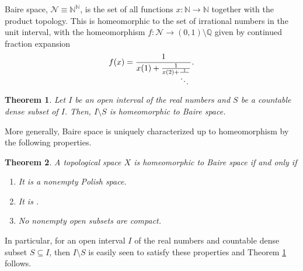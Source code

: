 \documentclass[12pt]{article}
\newtheorem{theorem}{Theorem}
\begin{document}

Baire space, $\mathcal{N}\equiv\mathbb{N}^\mathbb{N}$, is the set of all functions $x\colon\mathbb{N}\rightarrow\mathbb{N}$ together with the product topology. This is homeomorphic to the set of irrational numbers in the unit interval, with the homeomorphism $f\colon\mathcal{N}\rightarrow(0,1)\setminus\mathbb{Q}$ given by continued fraction expansion
\begin{equation*}
f(x)=\frac{1}{x(1)+\frac{1}{x(2)+\frac{1}{\ddots}}}.
\end{equation*}

\begin{theorem}\label{thm:1}
Let $I$ be an open interval of the real numbers and $S$ be a countable dense subset of $I$. Then, $I\setminus S$ is homeomorphic to Baire space.
\end{theorem}

More generally, Baire space is uniquely characterized up to homeomorphism by the following properties.

\begin{theorem}
A topological space $X$ is homeomorphic to Baire space if and only if
\begin{enumerate}
\item It is a nonempty Polish space.
\item It is .
\item No nonempty open subsets are compact.
\end{enumerate}
\end{theorem}

In particular, for an open interval $I$ of the real numbers and countable dense subset $S\subseteq I$, then $I\setminus S$ is easily seen to satisfy these properties and Theorem \ref{thm:1} follows.

\end{document}
